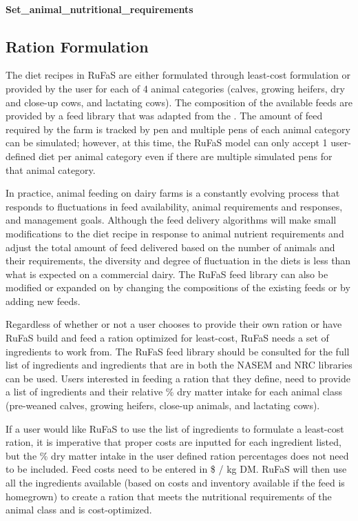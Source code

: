 \begin{refsection}
    \paragraph{Set\_animal\_nutritional\_requirements}


\subsection{Ration Formulation}
The diet recipes in RuFaS are either formulated through least-cost formulation \parencite{Li2022} or provided by the user for each of 4 animal categories (calves, growing heifers, dry and close-up cows, and lactating cows). The composition of the available feeds are provided by a feed library that was adapted from the \cite{nrc2021}. The amount of feed required by the farm is tracked by pen and multiple pens of each animal category can be simulated; however, at this time, the RuFaS model can only accept 1 user-defined diet per animal category even if there are multiple simulated pens for that animal category.  

In practice, animal feeding on dairy farms is a constantly evolving process that responds to fluctuations in feed availability, animal requirements and responses, and management goals. Although the feed delivery algorithms will make small modifications to the diet recipe in response to animal nutrient requirements and adjust the total amount of feed delivered based on the number of animals and their requirements, the diversity and degree of fluctuation in the diets is less than what is expected on a commercial dairy. The RuFaS feed library can also be modified or expanded on by changing the compositions of the existing feeds or by adding new feeds. 

Regardless of whether or not a user chooses to provide their own ration or have RuFaS build and feed a ration optimized for least-cost, RuFaS needs a set of ingredients to work from. The RuFaS feed library should be consulted for the full list of ingredients and ingredients that are in both the NASEM and NRC libraries can be used. Users interested in feeding a ration that they define, need to provide a list of ingredients and their relative \% dry matter intake for each animal class (pre-weaned calves, growing heifers, close-up animals, and lactating cows). 

\vspace{0.2cm}

If a user would like RuFaS to use the list of ingredients to formulate a least-cost ration, it is imperative that proper costs are inputted for each ingredient listed, but the \% dry matter intake in the user defined ration percentages does not need to be included. Feed costs need to be entered in \$ / kg DM. RuFaS will then use all the ingredients available (based on costs and inventory available if the feed is homegrown) to create a ration that meets the nutritional requirements of the animal class and is cost-optimized. 



\end{refsection}
